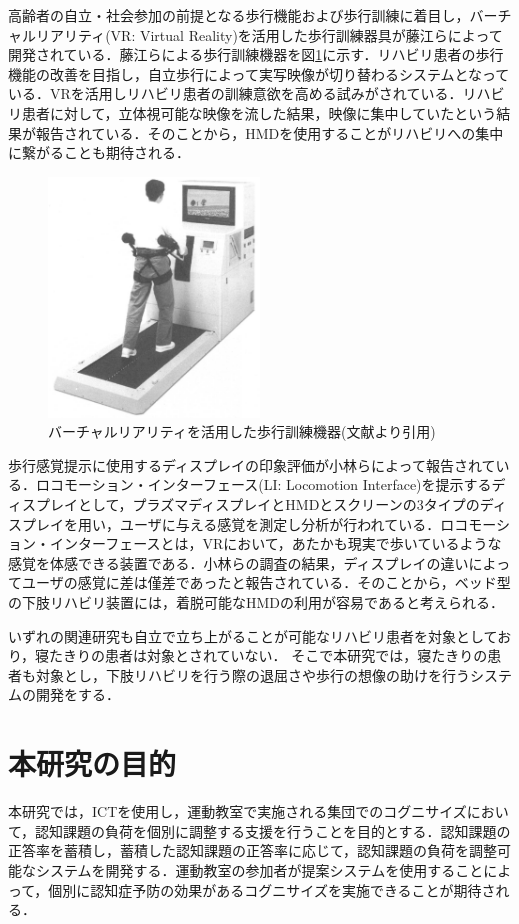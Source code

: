 高齢者の自立・社会参加の前提となる歩行機能および歩行訓練に着目し，バーチャルリアリティ(VR: Virtual Reality)を活用した歩行訓練器具\cite{日立}が藤江らによって開発されている．藤江らによる歩行訓練機器を図\ref{fig:hitachi}に示す．リハビリ患者の歩行機能の改善を目指し，自立歩行によって実写映像が切り替わるシステムとなっている．VRを活用しリハビリ患者の訓練意欲を高める試みがされている．リハビリ患者に対して，立体視可能な映像を流した結果，映像に集中していたという結果が報告されている．そのことから，HMDを使用することがリハビリへの集中に繋がることも期待される．

\begin{figure}[tbp]
	\centering
			\includegraphics[width=0.5\textwidth]{chap1-figure/VRhokou.eps}
	\caption{バーチャルリアリティを活用した歩行訓練機器(文献\cite{日立}より引用)}
	\label{fig:hitachi}
\end{figure}

歩行感覚提示に使用するディスプレイの印象評価\cite{ディスプレイの違い}が小林らによって報告されている．ロコモーション・インターフェース\cite{ロコモーション}(LI: Locomotion Interface)を提示するディスプレイとして，プラズマディスプレイとHMDとスクリーンの3タイプのディスプレイを用い，ユーザに与える感覚を測定し分析が行われている．ロコモーション・インターフェースとは，VRにおいて，あたかも現実で歩いているような感覚を体感できる装置である．小林らの調査の結果，ディスプレイの違いによってユーザの感覚に差は僅差であったと報告されている．そのことから，ベッド型の下肢リハビリ装置には，着脱可能なHMDの利用が容易であると考えられる．

いずれの関連研究も自立で立ち上がることが可能なリハビリ患者を対象としており，寝たきりの患者は対象とされていない．
そこで本研究では，寝たきりの患者も対象とし，下肢リハビリを行う際の退屈さや歩行の想像の助けを行うシステムの開発をする．
\fi

\section{本研究の目的}
本研究では，ICTを使用し，運動教室で実施される集団でのコグニサイズにおいて，認知課題の負荷を個別に調整する支援を行うことを目的とする．認知課題の正答率を蓄積し，蓄積した認知課題の正答率に応じて，認知課題の負荷を調整可能なシステムを開発する．運動教室の参加者が提案システムを使用することによって，個別に認知症予防の効果があるコグニサイズを実施できることが期待される．

